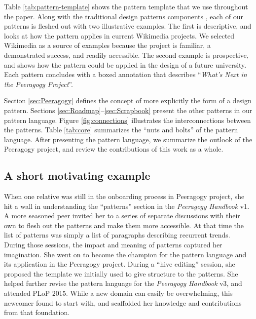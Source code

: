 Table \ref{tab:pattern-template} shows the pattern template that we use throughout the paper.  
Along with the traditional design patterns components \cite{meszaros1998pattern}, each of our patterns is fleshed out with two illustrative examples.  The first is descriptive, and looks at how the pattern applies in current Wikimedia projects.  We selected Wikimedia as a source of examples because the project is familiar, a demonstrated success, and readily accessible.  The second example is prospective, and shows how the pattern could be applied in the design of a future university.  Each pattern concludes with a boxed annotation that describes ``\emph{What's Next in the Peeragogy Project}''.

Section \ref{sec:Peeragogy} defines the concept of
 more explicitly the form of a design pattern.
Sections \ref{sec:Roadmap}--\ref{sec:Scrapbook} present the other
patterns in our pattern language.  Figure \ref{fig:connections}
illustrates the interconnections between the patterns. Table
\ref{tab:core} summarizes the ``nuts and bolts'' of the pattern
language.  After presenting the pattern language, we summarize the
outlook of the Peeragogy project, and review the contributions of this
work as a whole.

\subsection*{A short motivating example}
When one relative  was still in the onboarding process in Peeragogy project, she hit a wall in understanding the ``patterns'' section in the \emph{Peeragogy Handbook} v1.  A more seasoned peer invited her to a series of separate discussions with their own  to flesh out the patterns and make them more accessible.  At that time the list of patterns was simply a list of paragraphs describing recurrent trends.  During those sessions, the impact and meaning of patterns captured her imagination.  She went on to become the champion for the pattern language and its application in the Peeragogy project.  During a ``hive editing'' session, she proposed the template we initially used to give structure to the patterns.  She helped further revise the pattern language for the \emph{Peeragogy Handbook}  v3, and attended PLoP 2015.  While a new domain can easily be overwhelming, this newcomer found  to start with, and scaffolded her knowledge and contributions from that foundation.

